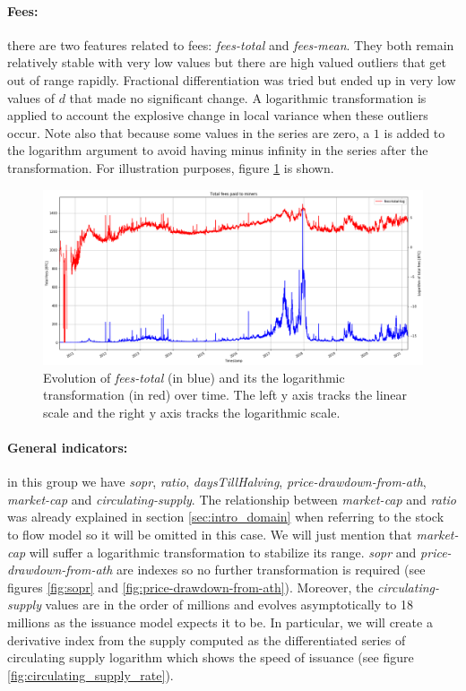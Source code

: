 \paragraph{Fees:} there are two features related to fees: \emph{fees-total} and
\emph{fees-mean}. They both remain relatively stable with very low values but 
there are high valued outliers that get out of range rapidly. Fractional
differentiation was tried but ended up in very low values of $d$ that made no
significant change.  A logarithmic transformation is applied to account the explosive change in local variance when
these outliers occur. Note also that because some values in the series are zero,
a $1$ is added to the logarithm argument to avoid having minus infinity in the
series after the transformation. For illustration purposes, figure
\ref{fig:total_fees} is shown.

\begin{figure}[H]
    \centering
    \includegraphics[width=\textwidth]{methods/images/total_fees.png}
    \caption{Evolution of \emph{fees-total} (in blue) and its the logarithmic transformation (in red) over time. The left y axis tracks the linear scale and the right y axis tracks the logarithmic scale.}
    \label{fig:total_fees}
\end{figure}

\paragraph{General indicators:} in this group we have \emph{sopr}, \emph{ratio},
\emph{daysTillHalving}, \emph{price-drawdown-from-ath}, \emph{market-cap} and
\emph{circulating-supply}. The relationship between \emph{market-cap} and 
\emph{ratio} was already explained in section \ref{sec:intro_domain} when
referring to the stock to flow model so it will be omitted in this case. We will
just mention that \emph{market-cap} will suffer a logarithmic transformation to
stabilize its range. \emph{sopr} and \emph{price-drawdown-from-ath} are indexes
so no further transformation is required (see figures \ref{fig:sopr} and
\ref{fig:price-drawdown-from-ath}). Moreover, the \emph{circulating-supply}
values are in the order of millions and evolves asymptotically to 18 millions as
the issuance model expects it to be. In particular, we will create a derivative
index from the supply computed as the differentiated series of circulating
supply logarithm which shows the speed of issuance (see figure \ref{fig:circulating_supply_rate}).

